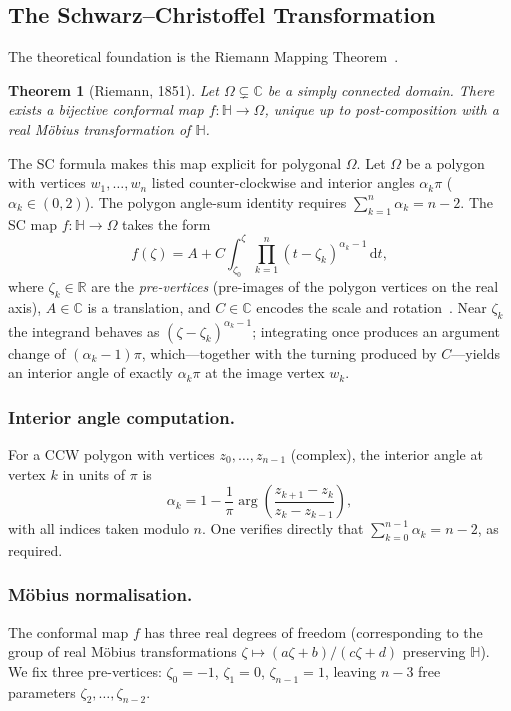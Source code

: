 \documentclass[11pt]{article}
\newcommand{\HH}{\mathbb{H}}          %
\newcommand{\CC}{\mathbb{C}}
\newcommand{\RR}{\mathbb{R}}
\newcommand{\dif}{\,\mathrm{d}}
\newtheorem{theorem}{Theorem}
\begin{document}
\subsection{The Schwarz--Christoffel Transformation}

The theoretical foundation is the Riemann Mapping Theorem~\citep[Ch.~5]{AF03}.

\begin{theorem}[Riemann, 1851]
  Let $\Omega\subsetneq\CC$ be a simply connected domain. There exists a
  bijective conformal map $f:\HH\to\Omega$, unique up to
  post-composition with a real M\"obius transformation of $\HH$.
\end{theorem}

The SC formula makes this map explicit for polygonal $\Omega$. Let $\Omega$
be a polygon with vertices $w_1,\dots,w_n$ listed counter-clockwise and
interior angles $\alpha_k\pi$ ($\alpha_k\in(0,2)$). The polygon angle-sum
identity requires $\sum_{k=1}^n \alpha_k = n-2$. The SC map
$f:\HH\to\Omega$ takes the form
\begin{equation}
  f(\zeta) = A + C\int_{\zeta_0}^{\zeta}
    \prod_{k=1}^{n}(t-\zeta_k)^{\alpha_k-1}\dif t,
  \label{eq:SC}
\end{equation}
where $\zeta_k\in\RR$ are the \emph{pre-vertices} (pre-images of the
polygon vertices on the real axis), $A\in\CC$ is a translation, and
$C\in\CC$ encodes the scale and rotation~\citep[Ch.~5]{DT09}. Near $\zeta_k$
the integrand behaves as $(\zeta-\zeta_k)^{\alpha_k-1}$; integrating once
produces an argument change of $(\alpha_k-1)\pi$, which---together with the
turning produced by $C$---yields an interior angle of exactly $\alpha_k\pi$
at the image vertex $w_k$.

\subsubsection*{Interior angle computation.}
For a CCW polygon with vertices $z_0,\dots,z_{n-1}$ (complex), the interior
angle at vertex $k$ in units of $\pi$ is
\begin{equation}
  \alpha_k = 1 - \frac{1}{\pi}
    \arg\!\left(\frac{z_{k+1}-z_k}{z_k-z_{k-1}}\right),
  \label{eq:alpha}
\end{equation}
with all indices taken modulo $n$. One verifies directly that
$\sum_{k=0}^{n-1}\alpha_k = n-2$, as required.

\subsubsection*{M\"obius normalisation.}
The conformal map $f$ has three real degrees of freedom (corresponding to the
group of real M\"obius transformations $\zeta\mapsto(a\zeta+b)/(c\zeta+d)$
preserving $\HH$). We fix three pre-vertices:
$\zeta_0=-1$, $\zeta_1=0$, $\zeta_{n-1}=1$,
leaving $n-3$ free parameters $\zeta_2,\dots,\zeta_{n-2}$.
\end{document}
